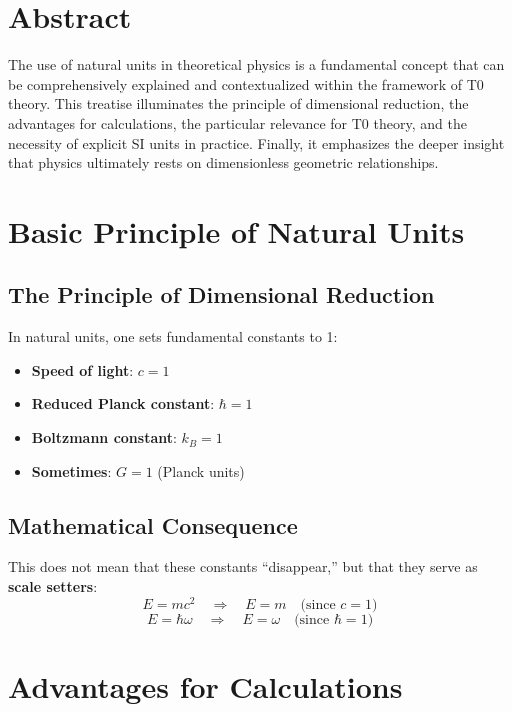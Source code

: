 \section*{Abstract}
		The use of natural units in theoretical physics is a fundamental concept that can be comprehensively explained and contextualized within the framework of T0 theory. This treatise illuminates the principle of dimensional reduction, the advantages for calculations, the particular relevance for T0 theory, and the necessity of explicit SI units in practice. Finally, it emphasizes the deeper insight that physics ultimately rests on dimensionless geometric relationships.

	
	
	\section{Basic Principle of Natural Units}
	\label{sec:grundprinzip}
	
	\subsection{The Principle of Dimensional Reduction}
	In natural units, one sets fundamental constants to 1:
	\begin{itemize}
		\item \textbf{Speed of light}: $c = 1$
		\item \textbf{Reduced Planck constant}: $\hbar = 1$
		\item \textbf{Boltzmann constant}: $k_B = 1$
		\item \textbf{Sometimes}: $G = 1$ (Planck units)
	\end{itemize}
	
	\subsection{Mathematical Consequence}
	This does not mean that these constants ``disappear,'' but that they serve as \textbf{scale setters}:
	\begin{equation}
		E = m c^2 \quad \Rightarrow \quad E = m \quad \text{(since $c=1$)}
	\end{equation}
	\begin{equation}
		E = \hbar \omega \quad \Rightarrow \quad E = \omega \quad \text{(since $\hbar=1$)}
	\end{equation}
	
	\section{Advantages for Calculations}
	
